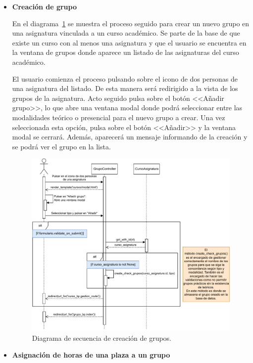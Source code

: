 \begin{itemize}
\item \textbf{Creación de grupo}

En el diagrama~\ref{DS-crearGrupo} se muestra el proceso seguido para crear un nuevo grupo en una asignatura vinculada a un curso académico. Se parte de la base de que existe un curso con al menos una asignatura y que el usuario se encuentra en la ventana de grupos donde aparece un listado de las asignaturas del curso académico.

El usuario comienza el proceso pulsando sobre el icono de dos personas de una asignatura del listado. De esta manera será redirigido a la vista de los grupos de la asignatura. Acto seguido pulsa sobre el botón <<Añadir grupo>>, lo que abre una ventana modal donde podrá seleccionar entre las modalidades teórico o presencial para el nuevo grupo a crear. Una vez seleccionada esta opción, pulsa sobre el botón <<Añadir>> y la ventana modal se cerrará. Además, aparecerá un mensaje informando de la creación y se podrá ver el grupo en la lista.

\begin{figure}
	\centering
	\includegraphics[width=\textwidth]{../img/Anexos/Diagramas secuencia/DS - crear grupo.pdf}
	\caption{Diagrama de secuencia de creación de grupos.}\label{DS-crearGrupo}
\end{figure}

\item \textbf{Asignación de horas de una plaza a un grupo}


\end{itemize}
